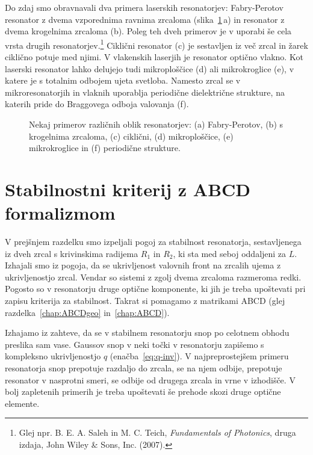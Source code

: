 Do zdaj smo obravnavali dva primera laserskih resonatorjev: Fabry-Perotov
resonator z dvema vzporednima ravnima zrcaloma (slika~\ref{fig:resonatorji}\,a) 
in resonator z dvema krogelnima zrcaloma (b).
Poleg teh dveh primerov je v uporabi še cela vrsta drugih resonatorjev.\footnote{Glej 
npr. B. E. A. Saleh in M. C. Teich, 
{\it Fundamentals of Photonics}, druga izdaja, John Wiley \& Sons, Inc. (2007).} Ciklični
resonator (c) je
sestavljen iz več zrcal in žarek ciklično potuje med njimi. V vlakenskih laserjih je resonator
optično vlakno. 
Kot laserski resonator lahko delujejo tudi mikroploščice (d) ali mikrokroglice (e), 
v katere je s totalnim odbojem ujeta svetloba. 
Namesto zrcal se v mikroresonatorjih in vlaknih uporablja periodične dielektrične strukture, na katerih 
pride do Braggovega odboja valovanja (f).
\begin{figure}[ht]
\centering
\def\svgwidth{128truemm} 

\caption{Nekaj primerov različnih oblik resonatorjev: (a) Fabry-Perotov, (b) s krogelnima
zrcaloma, (c) ciklični, (d) mikroploščice, (e) mikrokroglice in (f) periodične strukture.}
\label{fig:resonatorji}
\end{figure}

\section{Stabilnostni kriterij z ABCD formalizmom}
V prejšnjem razdelku smo izpeljali pogoj za stabilnost resonatorja, 
sestavljenega iz dveh zrcal s krivinskima radijema $R_1$ in $R_2$, ki sta med 
seboj oddaljeni za $L$. Izhajali smo iz pogoja, da se ukrivljenost
valovnih front na zrcalih ujema z ukrivljenostjo zrcal. Vendar so sistemi z
zgolj dvema zrcaloma razmeroma redki. Pogosto so v resonatorju
druge optične komponente, ki jih je treba upoštevati pri zapisu
kriterija za stabilnost. Takrat si pomagamo z matrikami ABCD
(glej razdelka~\ref{chap:ABCDgeo} in~\ref{chap:ABCD}). 

Izhajamo iz zahteve, da se v stabilnem resonatorju snop po celotnem obhodu
preslika sam vase. Gaussov snop v neki točki v resonatorju 
zapišemo s kompleksno ukrivljenostjo $q$ (enačba~\ref{eq:q-inv}).
V najpreprostejšem primeru resonatorja snop prepotuje razdaljo do zrcala, se na njem 
odbije, prepotuje resonator v nasprotni smeri, se odbije od drugega zrcala in vrne 
v izhodišče. V bolj zapletenih primerih je treba upoštevati še 
prehode skozi druge optične elemente.

